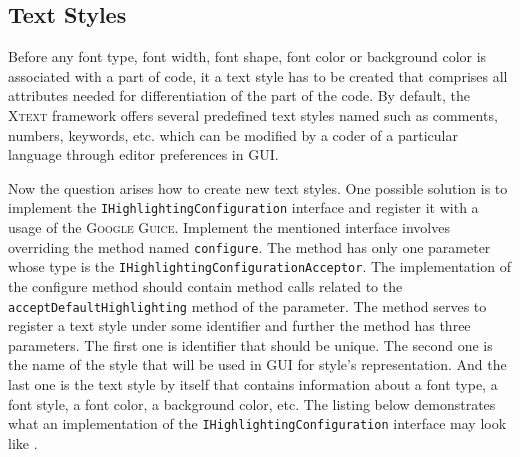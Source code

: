\documentclass[12pt,notitlepage,a4paper]{report}
\begin{document}
\subsection{Text Styles}
\label{TextStyles}
Before any font type, font width, font shape, font color or background color is associated with a part of code, it a text style has to be created  that comprises all attributes needed for differentiation of the part of the code. By default, the \textsc{Xtext} framework offers several predefined text styles named such as comments, numbers, keywords, etc. which can be modified by a coder of a particular language through editor preferences in GUI. 

Now the question arises how to create new text styles. One possible solution is to implement the \texttt{IHighlightingConfiguration} interface and register it  with a usage of the \textsc{Google Guice}. Implement the mentioned interface involves overriding the method named \texttt{configure}. The method has only one parameter whose type is the \texttt{IHighlightingConfigurationAcceptor}. The implementation of the configure method should contain method calls related to the \texttt{acceptDefaultHighlighting} method of the parameter. The method serves to register a text style under some identifier and further the method has three parameters. The first one is identifier that should be unique. The second one is the name of the style that will be used in GUI for style's representation. And the last one is the text style by itself that contains information about a font type,  a font style, a font color, a background color, etc. The listing below demonstrates what an implementation of the \texttt{IHighlightingConfiguration} interface may look like .
\end{document}
